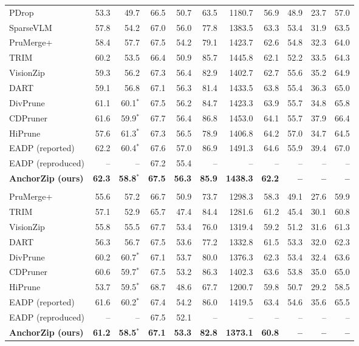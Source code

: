 \documentclass[10pt,a4paper]{article}
\begin{document}
{\begin{tabular}{lrrrrrrrrrr}
PDrop & 53.3 & 49.7 & 66.5 & 50.7 & 63.5 & 1180.7 & 56.9 & 48.9 & 23.7 & 57.0 \\
SparseVLM & 57.8 & 54.2 & 67.0 & 56.0 & 77.8 & 1383.5 & 63.3 & 53.4 & 31.9 & 63.5 \\
PruMerge+ & 58.4 & 57.7 & 67.5 & 54.2 & 79.1 & 1423.7 & 62.6 & 54.8 & 32.3 & 64.0 \\
TRIM & 60.2 & 53.5 & 66.4 & 50.9 & 85.7 & 1445.8 & 62.1 & 52.2 & 33.5 & 64.3 \\
VisionZip & 59.3 & 56.2 & 67.3 & 56.4 & 82.9 & 1402.7 & 62.7 & 55.6 & 35.2 & 64.9 \\
DART & 59.1 & 56.8 & 67.1 & 56.3 & 81.4 & 1433.5 & 63.8 & 55.4 & 36.3 & 65.0 \\
DivPrune & 61.1 & 60.1$^{*}$ & 67.5 & 56.2 & 84.7 & 1423.3 & 63.9 & 55.7 & 34.8 & 65.8 \\
CDPruner & 61.6 & 59.9$^{*}$ & 67.7 & 56.4 & 86.8 & 1453.0 & 64.1 & 55.7 & 37.9 & 66.4 \\
HiPrune & 57.6 & 61.3$^{*}$ & 67.3 & 56.5 & 78.9 & 1406.8 & 64.2 & 57.0 & 34.7 & 64.5 \\
EADP (reported) & 62.2 & 60.4$^{*}$ & 67.6 & 57.0 & 86.9 & 1491.3 & 64.6 & 55.9 & 39.4 & 67.0 \\
EADP (reproduced) & -- & -- & 67.2 & 55.4 & -- & -- & -- & -- & -- & -- \\
\textbf{AnchorZip (ours)} & \textbf{62.3} & \textbf{58.8$^{*}$} & \textbf{67.5} & \textbf{56.3} & \textbf{85.9} & \textbf{1438.3} & \textbf{62.2} & \textbf{--} & \textbf{--} & \textbf{--} \\
\rowcolor{black!12}\multicolumn{11}{c}{\textit{Retain 160 tokens (nominal)}} \\
PruMerge+ & 55.6 & 57.2 & 66.7 & 50.9 & 73.7 & 1298.3 & 58.3 & 49.1 & 27.6 & 59.9 \\
TRIM & 57.1 & 52.9 & 65.7 & 47.4 & 84.4 & 1281.6 & 61.2 & 45.4 & 30.1 & 60.8 \\
VisionZip & 55.8 & 55.5 & 67.7 & 53.4 & 76.0 & 1319.4 & 59.2 & 51.2 & 31.6 & 61.3 \\
DART & 56.3 & 56.7 & 67.5 & 53.6 & 77.2 & 1332.8 & 61.5 & 53.3 & 32.0 & 62.3 \\
DivPrune & 60.2 & 60.7$^{*}$ & 67.1 & 53.7 & 80.0 & 1376.3 & 62.3 & 53.4 & 32.4 & 63.6 \\
CDPruner & 60.6 & 59.7$^{*}$ & 67.5 & 53.2 & 86.3 & 1402.3 & 63.6 & 53.8 & 35.0 & 65.0 \\
HiPrune & 53.7 & 59.5$^{*}$ & 68.7 & 48.6 & 67.7 & 1200.7 & 59.8 & 50.7 & 29.2 & 58.5 \\
EADP (reported) & 61.6 & 60.2$^{*}$ & 67.4 & 54.2 & 86.0 & 1419.5 & 63.4 & 54.6 & 35.6 & 65.5 \\
EADP (reproduced) & -- & -- & 67.5 & 52.1 & -- & -- & -- & -- & -- & -- \\
\textbf{AnchorZip (ours)} & \textbf{61.2} & \textbf{58.5$^{*}$} & \textbf{67.1} & \textbf{53.3} & \textbf{82.8} & \textbf{1373.1} & \textbf{60.8} & \textbf{--} & \textbf{--} & \textbf{--} \\
\bottomrule\end{tabular}}\endgroup\par\medskip
\end{document}
